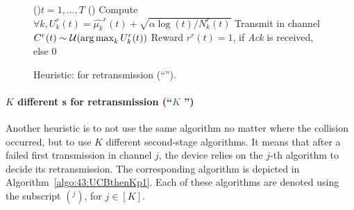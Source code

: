 \begin{figure}[h!]
	\centering
    \begin{framed}
	\begin{algorithm}[H]
		\For(){$t = 1, \dots, T$}{
			\uElse(){
				Compute $\forall k, U^r_k(t) = \widehat{\mu_k}^r(t) + \sqrt{\alpha \log(t) / N_k^r(t)}$\;
				Transmit in channel $C^r(t) \sim \mathcal{U}(\operatorname*{arg\,max}_k U^r_k(t))$\;
				Reward $r^r(t) = 1$, if \emph{Ack} is received, else $0$\;
			}
		}
		\caption[Heuristic: \UCB{} for retransmission.]{Heuristic: \UCB{} for retransmission (``\textcolor{purple}{\UCB{}}'').}    %
		\label{algo:43:TwoUCB}
	\end{algorithm}
	\end{framed}
\end{figure}


\paragraph{$K$ different {\UCB}s for retransmission (``\textcolor{green}{$K$ \UCB}'')}\label{sub:43:UCBthenKp1}
%
Another heuristic is to not use the same algorithm no matter where the collision occurred, but to use $K$ different second-stage \UCB{} algorithms.
It means that after a failed first transmission in channel $j$, the device relies on the $j$-th algorithm to decide its retransmission.
The corresponding algorithm is depicted in Algorithm~\ref{algo:43:UCBthenKp1}.
Each of these algorithms are denoted using the subscript $({}^{j})$, for $j\in[K]$.

